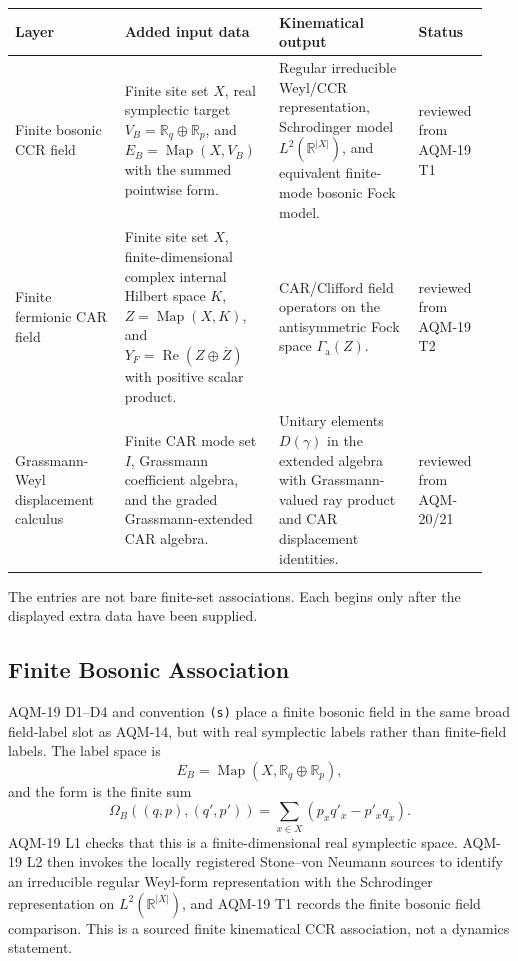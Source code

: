 \begin{center}
\small
\begin{tabular}{p{0.22\linewidth}p{0.31\linewidth}p{0.28\linewidth}p{0.13\linewidth}}
\toprule
Layer & Added input data & Kinematical output & Status \\
\midrule
Finite bosonic CCR field &
Finite site set \(X\), real symplectic target
\(V_B=\mathbb R_q\oplus\mathbb R_p\), and
\(E_B=\operatorname{Map}(X,V_B)\) with the summed pointwise form. &
Regular irreducible Weyl/CCR representation, Schrodinger model
\(L^2(\mathbb R^{|X|})\), and equivalent finite-mode bosonic Fock model. &
reviewed from AQM-19 T1 \\
\addlinespace
Finite fermionic CAR field &
Finite site set \(X\), finite-dimensional complex internal Hilbert space
\(K\), \(Z=\operatorname{Map}(X,K)\), and
\(Y_F=\operatorname{Re}(Z\oplus\overline Z)\) with positive scalar product. &
CAR/Clifford field operators on the antisymmetric Fock space
\(\Gamma_{\mathrm a}(Z)\). &
reviewed from AQM-19 T2 \\
\addlinespace
Grassmann-Weyl displacement calculus &
Finite CAR mode set \(I\), Grassmann coefficient algebra, and the graded
Grassmann-extended CAR algebra. &
Unitary elements \(D(\gamma)\) in the extended algebra with
Grassmann-valued ray product and CAR displacement identities. &
reviewed from AQM-20/21 \\
\bottomrule
\end{tabular}
\end{center}

The entries are not bare finite-set associations.  Each begins only after the
displayed extra data have been supplied.

\subsection{Finite Bosonic Association}

AQM-19 D1--D4 and convention \texttt{(s)} place a finite bosonic field in the
same broad field-label slot as AQM-14, but with real symplectic labels rather
than finite-field labels.  The label space is
\[
  E_B=\operatorname{Map}(X,\mathbb R_q\oplus\mathbb R_p),
\]
and the form is the finite sum
\[
  \Omega_B((q,p),(q',p'))
  =
  \sum_{x\in X}(p_x q'_x-p'_x q_x).
\]
AQM-19 L1 checks that this is a finite-dimensional real symplectic space.
AQM-19 L2 then invokes the locally registered Stone--von Neumann sources to
identify an irreducible regular Weyl-form representation with the Schrodinger
representation on \(L^2(\mathbb R^{|X|})\), and AQM-19 T1 records the finite
bosonic field comparison.  This is a sourced finite kinematical CCR
association, not a dynamics statement.

